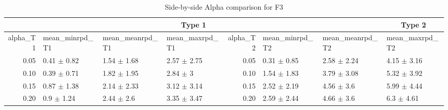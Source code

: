 \begin{table}[ht]
\centering
\begin{tabular}{rlllrlll}
  \multicolumn{7}{c}{Type 1} & \multicolumn{7}{c}{Type 2} \\ 
 \hline
alpha_T1 & mean_minrpd_T1 & mean_meanrpd_T1 & mean_maxrpd_T1 & alpha_T2 & mean_minrpd_T2 & mean_meanrpd_T2 & mean_maxrpd_T2 \\ 
  \hline
0.05 & 0.41 $\pm$ 0.82 & 1.54 $\pm$ 1.68 & 2.57 $\pm$ 2.75 & 0.05 & 0.31 $\pm$ 0.85 & 2.58 $\pm$ 2.24 & 4.15 $\pm$ 3.16 \\ 
  0.10 & 0.39 $\pm$ 0.71 & 1.82 $\pm$ 1.95 & 2.84 $\pm$ 3 & 0.10 & 1.54 $\pm$ 1.83 & 3.79 $\pm$ 3.08 & 5.32 $\pm$ 3.92 \\ 
  0.15 & 0.87 $\pm$ 1.38 & 2.14 $\pm$ 2.33 & 3.12 $\pm$ 3.14 & 0.15 & 2.52 $\pm$ 2.19 & 4.56 $\pm$ 3.6 & 5.99 $\pm$ 4.44 \\ 
  0.20 & 0.9 $\pm$ 1.24 & 2.44 $\pm$ 2.6 & 3.35 $\pm$ 3.47 & 0.20 & 2.59 $\pm$ 2.44 & 4.66 $\pm$ 3.6 & 6.3 $\pm$ 4.61 \\ 
   \hline
\end{tabular}
\caption{Side-by-side Alpha comparison for F3} 
\end{table}
